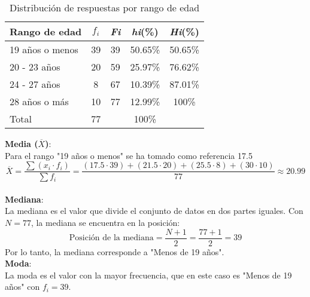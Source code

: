 \documentclass{article}
\begin{document}
	\begin{table}[h!]
		\centering
		\renewcommand{\arraystretch}{1.5} %
		\begin{tabular}{l c c c c}
			\hline
			{Rango de edad} & {\(f_i\)} & \textit{Fi} & \textit{hi}(\%) & \textit{Hi}(\%)\\
			\hline
			19 años o menos   & 39 & 39 & 50.65\% & 50.65\%\\
			20 - 23 años       & 20 & 59 & 25.97\% & 76.62\%\\
			24 - 27 años       & 8  & 67 & 10.39\% & 87.01\%\\
			28 años o más      & 10 & 77 & 12.99\% & 100\%\\
			\hline
			Total			   & 77 & & 100\% \\
			\hline
		\end{tabular}
		\caption{Distribución de respuestas por rango de edad}
		\label{tabla:edad}
	\end{table}
	
	\noindent \textbf{Media (\(\overline{X}\))}: \\
	Para el rango "19 años o menos" se ha tomado como referencia 17.5
	\begin{equation}
		\overline{X} = \frac{\sum (x_i \cdot f_i)}{\sum f_i} = \frac{(17.5 \cdot 39) + (21.5 \cdot 20) + (25.5 \cdot 8) + (30 \cdot 10)}{77} \approx 20.99
	\end{equation}\\
	
	\noindent \textbf{Mediana}: \\ 
	La mediana es el valor que divide el conjunto de datos en dos partes iguales. Con \(N = 77\), la mediana se encuentra en la posición:
	\begin{equation}
		\text{Posición de la mediana} = \frac{N + 1}{2} = \frac{77 + 1}{2} = 39
	\end{equation}
	Por lo tanto, la mediana corresponde a "Menos de 19 años".\\
	
	\noindent \textbf{Moda}: \\ 
	La moda es el valor con la mayor frecuencia, que en este caso es "Menos de 19 años" con \(f_i = 39\).
	
	\newpage
	
\end{document}
